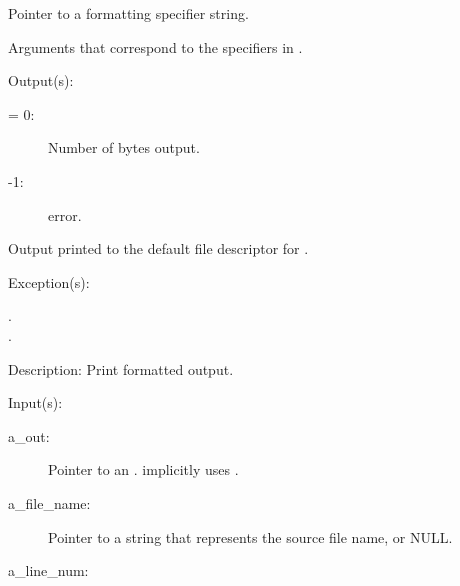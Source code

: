 \begin{capi}
\begin{capilist}
\begin{description}
			Pointer to a formatting specifier string.
		\item[...: ]
			Arguments that correspond to the specifiers in
			.
		\end{description}
	\item[Output(s): ]
		\begin{description}\item[]
		\item[retval: ]
			\begin{description}\item[]
			\item[{\gt}= 0: ]
				Number of bytes output.
			\item[-1: ]
				 error.
			\end{description}
		\item{Output printed to the default file descriptor for
			.}
		\end{description}
	\item[Exception(s): ]
		\begin{description}\item[]
		\item[.]
		\item[.]
		\end{description}
	\item[Description: ]
		Print formatted output.
	\end{capilist}
\label{out_put_e}
\label{_cw_out_put_e}
	\begin{capilist}
	\item[Input(s): ]
		\begin{description}\item[]
		\item[a\_out: ]
			Pointer to an .
			 implicitly uses
			.
		\item[a\_file\_name: ]
			Pointer to a string that represents the source file
			name, or NULL.
		\item[a\_line\_num: ]

\end{description}
\end{capilist}
\end{capi}
